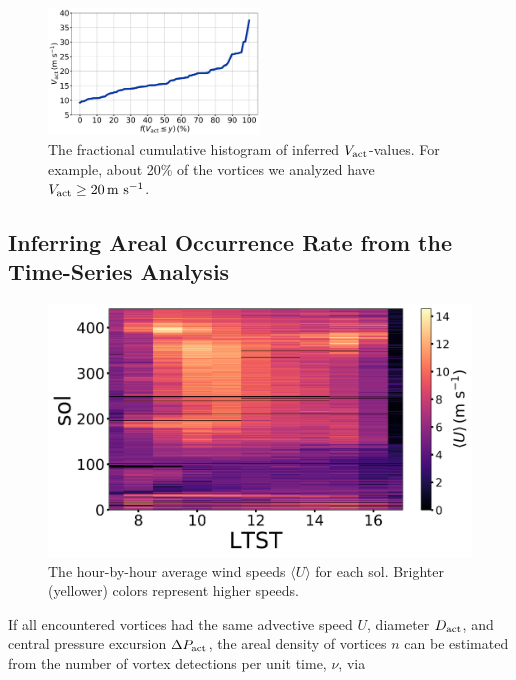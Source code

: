 \documentclass[linenumbers,trackchanges]{aastex63}
\begin{document}
\begin{figure}
    \centering
    \includegraphics[width=0.5\textwidth]{figures/cum_hist_Vact.png}
    \caption{The fractional cumulative histogram of inferred $V_{\rm act}$-values. For example, about 20\% of the vortices we analyzed have $V_{\rm act} \geq 20\,{\rm m\ s^{-1}}$.}
    \label{fig:cum_hist_Vact}
\end{figure}


\subsection{Inferring Areal Occurrence Rate from the Time-Series Analysis}
\label{sec:Inferring Areal Occurrence Rate from the Time-Series Analysis}

\begin{figure}
    \centering
    \includegraphics[width=\textwidth]{figures/advective_speeds.png}
    \caption{The hour-by-hour average wind speeds $\langle U \rangle$ for each sol. Brighter (yellower) colors represent higher speeds.}
    \label{fig:advective_speeds}
\end{figure}

If all encountered vortices had the same advective speed $U$, diameter $D_{\rm act}$, and central pressure excursion $\Delta P_{\rm act}$, the areal density of vortices $n$ can be estimated from the number of vortex detections per unit time, $\nu$, via
\end{document}
